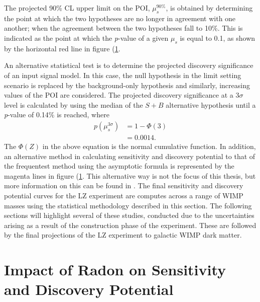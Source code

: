 {\begin{figure}[H!]
    \label{fig:plr_hypothesis_distributions}
\end{figure}
%

The projected 90\% CL upper limit on the POI, $\mu_{s}^{90\%}$, is obtained by determining the point at which the two hypotheses are no longer in agreement with one another; when the agreement between the two hypotheses fall to 10\%. This is indicated as the point at which the \textit{p}-value of a given $\mu_{s}$ is equal to 0.1, as shown by the horizontal red line in figure (\ref{fig:plr_hypothesis_distributions}. 

An alternative statistical test is to determine the projected discovery significance of an input signal model. In this case, the null hypothesis in the limit setting scenario is replaced by the background-only hypothesis and similarly, increasing values of the POI are considered. The projected discovery significance at a $3\sigma$ level is calculated by using the median of the $S+B$ alternative hypothesis until a \textit{p}-value of 0.14\% is reached, where
%
\begin{equation}
    \begin{split}
    p(\mu_{s}^{3\sigma}) &= 1 - \Phi(3) \\
    &= 0.0014. 
    \end{split}
    \label{eq:full_lz_likelihood}
\end{equation}
%
The $\Phi(Z)$ in the above equation is the normal cumulative function. In addition, an alternative method in calculating sensitivity and discovery potential to that of the frequentest method using the asymptotic formula is represented by the magenta lines in figure (\ref{fig:plr_hypothesis_distributions}. This alternative way is not the focus of this thesis, but more information on this can be found in \cite{ibles}. The final sensitivity and discovery potential curves for the LZ experiment are computes across a range of WIMP masses using the statistical methodology described in this section. The following sections will highlight several of these studies, conducted due to the uncertainties arising as a result of the construction phase of the experiment. These are followed by the final projections of the LZ experiment to galactic WIMP dark matter.


\section{Impact of Radon on Sensitivity and Discovery Potential}
\label{sec:radon_impact}

}
